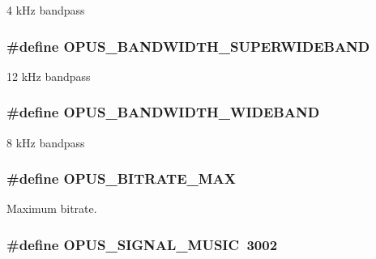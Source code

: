4 kHz bandpass \hypertarget{group__opus__ctlvalues_ga41f86df35af0033a7361895da88671c1}{
\subsubsection[{OPUS\_\-BANDWIDTH\_\-SUPERWIDEBAND}]{\setlength{\rightskip}{0pt plus 5cm}\#define OPUS\_\-BANDWIDTH\_\-SUPERWIDEBAND}}
\label{group__opus__ctlvalues_ga41f86df35af0033a7361895da88671c1}


12 kHz bandpass \hypertarget{group__opus__ctlvalues_gac698e5d1281a3632251d2a4ead48afb9}{
\subsubsection[{OPUS\_\-BANDWIDTH\_\-WIDEBAND}]{\setlength{\rightskip}{0pt plus 5cm}\#define OPUS\_\-BANDWIDTH\_\-WIDEBAND}}
\label{group__opus__ctlvalues_gac698e5d1281a3632251d2a4ead48afb9}


8 kHz bandpass \hypertarget{group__opus__ctlvalues_gaeadbaa3b4b9e15d39cd1d6e7d91519e5}{
\subsubsection[{OPUS\_\-BITRATE\_\-MAX}]{\setlength{\rightskip}{0pt plus 5cm}\#define OPUS\_\-BITRATE\_\-MAX}}
\label{group__opus__ctlvalues_gaeadbaa3b4b9e15d39cd1d6e7d91519e5}


Maximum bitrate. \hypertarget{group__opus__ctlvalues_gaa0c228c664b6d426f4c213e3a5350889}{
\subsubsection[{OPUS\_\-SIGNAL\_\-MUSIC}]{\setlength{\rightskip}{0pt plus 5cm}\#define OPUS\_\-SIGNAL\_\-MUSIC~3002}}
\label{group__opus__ctlvalues_gaa0c228c664b6d426f4c213e3a5350889}


